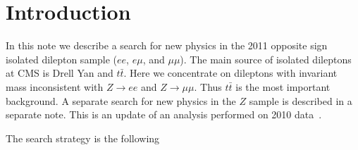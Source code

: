 \section{Introduction}
\label{sec:intro}

In this note we describe a search for new physics in the 2011 
opposite sign isolated dilepton sample ($ee$, $e\mu$, and $\mu\mu$).  
The main source of 
isolated dileptons at CMS is Drell Yan and $t\bar{t}$.
Here we concentrate on dileptons with invariant mass inconsistent
with $Z \to ee$ and $Z \to \mu\mu$.  Thus $t\bar{t}$ is the most
important background.  A separate search for new physics in the $Z$ 
sample is described in a separate note\cite{ref:Ztemplates}.
This is an update of an analysis performed on 2010 data~\cite{ref:osnote,ref:ospaper}. 

The search strategy is the following

